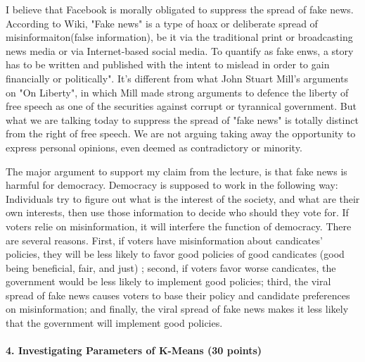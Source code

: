 \documentclass[11pt]{article} %
\begin{document}
I believe that Facebook is morally obligated to suppress the spread of fake news. According to Wiki, "Fake news" is a type of hoax or deliberate spread of misinformaiton(false information), be it via the traditional print or broadcasting news media or via Internet-based social media. To quantify as fake enws, a story has to be written and published with the intent to mislead in order to gain financially or politically". It's different from what John Stuart Mill's arguments on "On Liberty", in which Mill made strong arguments to defence the liberty of free speech as one of the securities against corrupt or tyrannical government. But what we are talking today to suppress the spread of "fake news" is totally distinct from the right of free speech. We are not arguing taking away the opportunity to express personal opinions, even deemed as contradictory or minority.  

The major argument to support my claim from the lecture, is that fake news is harmful for democracy. Democracy is supposed to work in the following way: Individuals try to figure out what is the interest of the society, and what are their own interests, then use those information to decide who should they vote for. If voters relie on misinformation, it will interfere the function of democracy. There are several reasons. First, if voters have misinformation about candicates' policies, they will be less likely to favor good policies of good candicates (good being beneficial, fair, and just) ; second, if voters favor worse candicates, the government would be less likely to implement good policies; third, the viral spread of fake news causes voters to base their policy and candidate preferences on misinformation; and finally, the viral spread of fake news makes it less likely that the government will implement good policies.   




\paragraph{4. Investigating Parameters of K-Means (30 points)}
 
\end{document}
